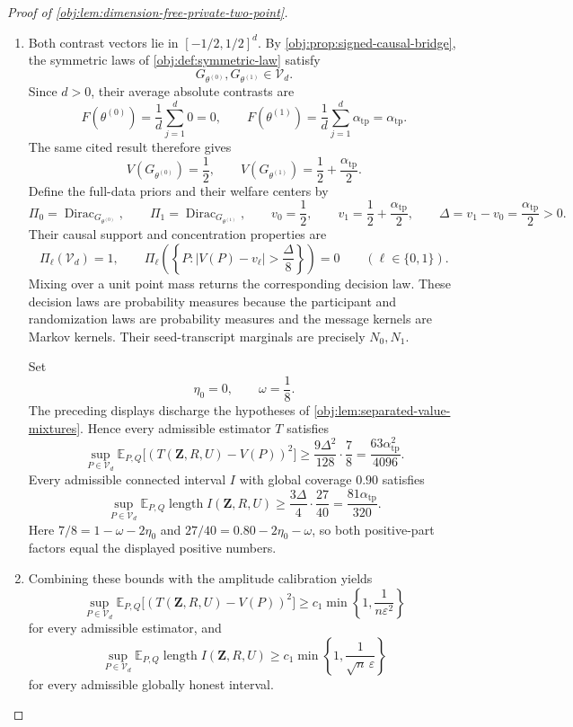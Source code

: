 \begin{proof}[Proof of \cref{obj:lem:dimension-free-private-two-point}]
\begin{enumerate}
\item Both contrast vectors lie in \([-1/2,1/2]^d\). By
\cref{obj:prop:signed-causal-bridge}, the symmetric laws of
\cref{obj:def:symmetric-law} satisfy
\[
G_{\theta^{(0)}},G_{\theta^{(1)}}\in\mathcal V_d.
\]
Since \(d>0\), their average absolute contrasts are
\[
F(\theta^{(0)})=\frac1d\sum_{j=1}^d0=0,
\qquad
F(\theta^{(1)})
=\frac1d\sum_{j=1}^d\alpha_{\mathrm{tp}}
=\alpha_{\mathrm{tp}}.
\]
The same cited result therefore gives
\[
V(G_{\theta^{(0)}})=\frac12,
\qquad
V(G_{\theta^{(1)}})=\frac12+\frac{\alpha_{\mathrm{tp}}}{2}.
\]
Define the full-data priors and their welfare centers by
\[
\Pi_0=\operatorname{Dirac}_{G_{\theta^{(0)}}},
\qquad
\Pi_1=\operatorname{Dirac}_{G_{\theta^{(1)}}},
\qquad
v_0=\frac12,
\qquad
v_1=\frac12+\frac{\alpha_{\mathrm{tp}}}{2},
\qquad
\Delta=v_1-v_0=\frac{\alpha_{\mathrm{tp}}}{2}>0.
\]
Their causal support and concentration properties are
\[
\Pi_\ell(\mathcal V_d)=1,
\qquad
\Pi_\ell\left(\left\{P:
|V(P)-v_\ell|>\frac{\Delta}{8}\right\}\right)=0
\qquad(\ell\in\{0,1\}).
\]
Mixing over a unit point mass returns the corresponding decision law. These decision laws are probability measures because the participant and randomization laws are probability measures and the message kernels are Markov kernels. Their seed-transcript marginals are precisely \(N_0,N_1\).

Set
\[
\eta_0=0,\qquad \omega=\frac18.
\]
The preceding displays discharge the hypotheses of
\cref{obj:lem:separated-value-mixtures}. Hence every admissible estimator \(T\) satisfies
\[
\sup_{P\in\mathcal V_d}
\mathbb E_{P,Q}\bigl[(T(\mathbf Z,R,U)-V(P))^2\bigr]
\ge
\frac{9\Delta^2}{128}\cdot\frac78
=
\frac{63\alpha_{\mathrm{tp}}^2}{4096}.
\]
Every admissible connected interval \(I\) with global coverage \(0.90\) satisfies
\[
\sup_{P\in\mathcal V_d}
\mathbb E_{P,Q}\operatorname{length}I(\mathbf Z,R,U)
\ge
\frac{3\Delta}{4}\cdot\frac{27}{40}
=
\frac{81\alpha_{\mathrm{tp}}}{320}.
\]
Here \(7/8=1-\omega-2\eta_0\) and
\(27/40=0.80-2\eta_0-\omega\), so both positive-part factors equal the displayed positive numbers.

\item Combining these bounds with the amplitude calibration yields
\[
\sup_{P\in\mathcal V_d}
\mathbb E_{P,Q}\bigl[(T(\mathbf Z,R,U)-V(P))^2\bigr]
\ge
c_1\min\left\{1,\frac1{n\varepsilon^2}\right\}
\]
for every admissible estimator, and
\[
\sup_{P\in\mathcal V_d}
\mathbb E_{P,Q}\operatorname{length}I(\mathbf Z,R,U)
\ge
c_1\min\left\{1,\frac1{\sqrt n\,\varepsilon}\right\}
\]
for every admissible globally honest interval.


\end{enumerate}
\end{proof}
